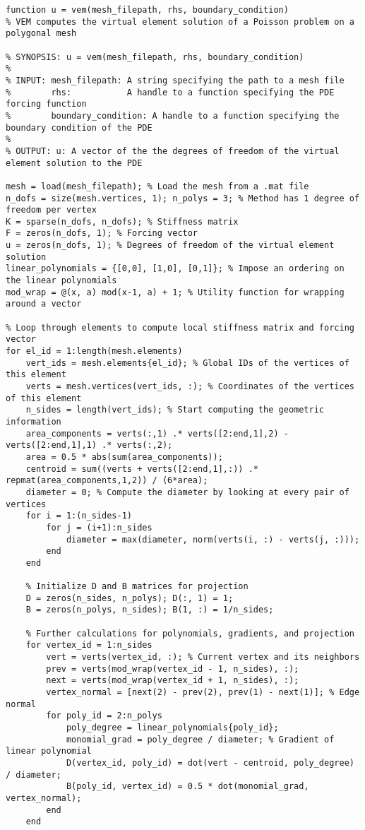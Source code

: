 \begin{lstlisting}[style=MatlabStyle]
function u = vem(mesh_filepath, rhs, boundary_condition)
% VEM computes the virtual element solution of a Poisson problem on a polygonal mesh

% SYNOPSIS: u = vem(mesh_filepath, rhs, boundary_condition)
%
% INPUT: mesh_filepath: A string specifying the path to a mesh file
%        rhs:           A handle to a function specifying the PDE forcing function
%        boundary_condition: A handle to a function specifying the boundary condition of the PDE
% 
% OUTPUT: u: A vector of the the degrees of freedom of the virtual element solution to the PDE

mesh = load(mesh_filepath); % Load the mesh from a .mat file
n_dofs = size(mesh.vertices, 1); n_polys = 3; % Method has 1 degree of freedom per vertex
K = sparse(n_dofs, n_dofs); % Stiffness matrix
F = zeros(n_dofs, 1); % Forcing vector
u = zeros(n_dofs, 1); % Degrees of freedom of the virtual element solution
linear_polynomials = {[0,0], [1,0], [0,1]}; % Impose an ordering on the linear polynomials
mod_wrap = @(x, a) mod(x-1, a) + 1; % Utility function for wrapping around a vector

% Loop through elements to compute local stiffness matrix and forcing vector
for el_id = 1:length(mesh.elements)
    vert_ids = mesh.elements{el_id}; % Global IDs of the vertices of this element
    verts = mesh.vertices(vert_ids, :); % Coordinates of the vertices of this element
    n_sides = length(vert_ids); % Start computing the geometric information
    area_components = verts(:,1) .* verts([2:end,1],2) - verts([2:end,1],1) .* verts(:,2);
    area = 0.5 * abs(sum(area_components));
    centroid = sum((verts + verts([2:end,1],:)) .* repmat(area_components,1,2)) / (6*area);
    diameter = 0; % Compute the diameter by looking at every pair of vertices
    for i = 1:(n_sides-1)
        for j = (i+1):n_sides
            diameter = max(diameter, norm(verts(i, :) - verts(j, :)));
        end
    end

    % Initialize D and B matrices for projection
    D = zeros(n_sides, n_polys); D(:, 1) = 1;
    B = zeros(n_polys, n_sides); B(1, :) = 1/n_sides;
    
    % Further calculations for polynomials, gradients, and projection
    for vertex_id = 1:n_sides
        vert = verts(vertex_id, :); % Current vertex and its neighbors
        prev = verts(mod_wrap(vertex_id - 1, n_sides), :);
        next = verts(mod_wrap(vertex_id + 1, n_sides), :);
        vertex_normal = [next(2) - prev(2), prev(1) - next(1)]; % Edge normal
        for poly_id = 2:n_polys
            poly_degree = linear_polynomials{poly_id};
            monomial_grad = poly_degree / diameter; % Gradient of linear polynomial
            D(vertex_id, poly_id) = dot(vert - centroid, poly_degree) / diameter;
            B(poly_id, vertex_id) = 0.5 * dot(monomial_grad, vertex_normal);
        end
    end


\end{lstlisting}
